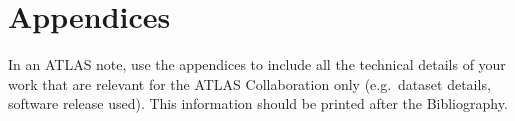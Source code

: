 \documentclass[NOTE, atlasdraft=true, texlive=2016, USenglish]{\ATLASLATEXPATH atlasdoc}
\begin{document}
\clearpage
\appendix
\part*{Appendices}

In an ATLAS note, use the appendices to include all the technical details of your work
that are relevant for the ATLAS Collaboration only (e.g.\ dataset details, software release used).
This information should be printed after the Bibliography.
\end{document}
